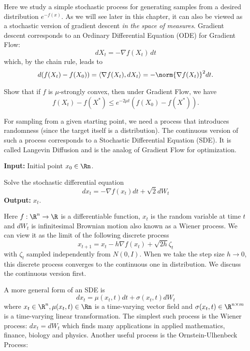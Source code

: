 Here we study a simple stochastic process for generating samples from
a desired distribution $e^{-f(x)}$. As we will see later in this
chapter, it can also be viewed as a stochastic version of gradient
descent \emph{in the space of measures}. Gradient descent corresponds
to an Ordinary Differential Equation (ODE) for Gradient Flow:
\[
dX_{t}=-\nabla f(X_{t})\,dt
\]
which, by the chain rule, leads to 
\[
d(f(X_{t})-f(X_{0}))=\langle\nabla f(X_{t}),dX_{t}\rangle=-\norm{\nabla f(X_{t})}^{2}dt.
\]

\begin{xca}
Show that if $f$ is $\mu$-strongly convex, then under Gradient Flow,
we have 
\[
f(X_{t})-f(X^{*})\le e^{-2\mu t}(f(X_{0})-f(X^{*})).
\]
\end{xca}

For sampling from a given starting point, we need a process that introduces
randomness (since the target itself is a distribution). The continuous
version of such a process corresponds to a Stochastic Differential
Equation (SDE). It is called Langevin Diffusion and is the analog
of Gradient Flow for optimization.

\begin{algorithm2e}[H]

\caption{$\mathtt{LangevinDiffusion}$ (LD)}

\SetAlgoLined

\textbf{Input:} Initial point $x_{0}\in\Rn$.

Solve the stochastic differential equation
\[
dx_{t}=-\nabla f(x_{t})dt+\sqrt{2}dW_{t}
\]
\textbf{Output:} $x_{t}$.

\end{algorithm2e}

Here $f:\R^{n}\rightarrow\R$ is a differentiable function, $x_{t}$
is the random variable at time $t$ and $dW_{t}$ is infinitesimal
Brownian motion also known as a Wiener process. We can view it as
the limit of the following discrete process 
\[
x_{t+1}=x_{t}-h\nabla f(x_{t})+\sqrt{2h}\zeta_{t}
\]
with $\zeta_{t}$ sampled independently from $N(0,I)$. When we take
the step size $h\rightarrow0$, this discrete process converges to
the continuous one in distribution. We discuss the continuous version
first.

A more general form of an SDE is 
\begin{equation}
dx_{t}=\mu(x_{t},t)dt+\sigma(x_{t},t)dW_{t}\label{eq:sde}
\end{equation}
 where $x_{t}\in\R^{n},\mu(x_{t},t)\in\Rn$ is a time-varying vector
field and $\sigma(x_{t},t)\in\R^{n\times m}$ is a time-varying linear
transformation. The simplest such process is the Wiener process: $dx_{t}=dW_{t}$
which finds many applications in applied mathematics, finance, biology
and physics. Another useful process is the Ornstein-Ulhenbeck Process: 

